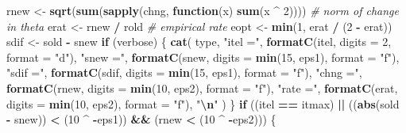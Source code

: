 \documentclass[
  12pt,
]{article}
\newenvironment{Shaded}{\begin{snugshade}}{\end{snugshade}}
\newcommand{\AttributeTok}[1]{\textcolor[rgb]{0.13,0.29,0.53}{#1}}
\newcommand{\CommentTok}[1]{\textcolor[rgb]{0.56,0.35,0.01}{\textit{#1}}}
\newcommand{\ControlFlowTok}[1]{\textcolor[rgb]{0.13,0.29,0.53}{\textbf{#1}}}
\newcommand{\DecValTok}[1]{\textcolor[rgb]{0.00,0.00,0.81}{#1}}
\newcommand{\FunctionTok}[1]{\textcolor[rgb]{0.13,0.29,0.53}{\textbf{#1}}}
\newcommand{\NormalTok}[1]{#1}
\newcommand{\OtherTok}[1]{\textcolor[rgb]{0.56,0.35,0.01}{#1}}
\newcommand{\SpecialCharTok}[1]{\textcolor[rgb]{0.81,0.36,0.00}{\textbf{#1}}}
\newcommand{\StringTok}[1]{\textcolor[rgb]{0.31,0.60,0.02}{#1}}
\begin{document}
\begin{Shaded}
\begin{Highlighting}[]
\NormalTok{      rnew }\OtherTok{\textless{}{-}}
        \FunctionTok{sqrt}\NormalTok{(}\FunctionTok{sum}\NormalTok{(}\FunctionTok{sapply}\NormalTok{(chng, }\ControlFlowTok{function}\NormalTok{(x)}
          \FunctionTok{sum}\NormalTok{(x }\SpecialCharTok{\^{}} \DecValTok{2}\NormalTok{)))) }\CommentTok{\# norm of change in theta}
\NormalTok{      erat }\OtherTok{\textless{}{-}}\NormalTok{ rnew }\SpecialCharTok{/}\NormalTok{ rold }\CommentTok{\# empirical rate}
\NormalTok{      eopt }\OtherTok{\textless{}{-}} \FunctionTok{min}\NormalTok{(}\DecValTok{1}\NormalTok{, erat }\SpecialCharTok{/}\NormalTok{ (}\DecValTok{2} \SpecialCharTok{{-}}\NormalTok{ erat))}
\NormalTok{      sdif }\OtherTok{\textless{}{-}}\NormalTok{ sold }\SpecialCharTok{{-}}\NormalTok{ snew}
      \ControlFlowTok{if}\NormalTok{ (verbose) \{}
        \FunctionTok{cat}\NormalTok{(}
\NormalTok{          type,}
          \StringTok{"itel ="}\NormalTok{,}
          \FunctionTok{formatC}\NormalTok{(itel, }\AttributeTok{digits =} \DecValTok{2}\NormalTok{, }\AttributeTok{format =} \StringTok{"d"}\NormalTok{),}
          \StringTok{"snew ="}\NormalTok{,}
          \FunctionTok{formatC}\NormalTok{(snew, }\AttributeTok{digits =} \FunctionTok{min}\NormalTok{(}\DecValTok{15}\NormalTok{, eps1), }\AttributeTok{format =} \StringTok{"f"}\NormalTok{),}
          \StringTok{"sdif ="}\NormalTok{,}
          \FunctionTok{formatC}\NormalTok{(sdif, }\AttributeTok{digits =} \FunctionTok{min}\NormalTok{(}\DecValTok{15}\NormalTok{, eps1), }\AttributeTok{format =} \StringTok{"f"}\NormalTok{),}
          \StringTok{"chng ="}\NormalTok{,}
          \FunctionTok{formatC}\NormalTok{(rnew, }\AttributeTok{digits =} \FunctionTok{min}\NormalTok{(}\DecValTok{10}\NormalTok{, eps2), }\AttributeTok{format =} \StringTok{"f"}\NormalTok{),}
          \StringTok{"rate ="}\NormalTok{,}
          \FunctionTok{formatC}\NormalTok{(erat, }\AttributeTok{digits =} \FunctionTok{min}\NormalTok{(}\DecValTok{10}\NormalTok{, eps2), }\AttributeTok{format =} \StringTok{"f"}\NormalTok{),}
          \StringTok{"}\SpecialCharTok{\textbackslash{}n}\StringTok{"}
\NormalTok{        )}
\NormalTok{      \}}
      \ControlFlowTok{if}\NormalTok{ ((itel }\SpecialCharTok{==}\NormalTok{ itmax) }\SpecialCharTok{||}
\NormalTok{          ((}\FunctionTok{abs}\NormalTok{(sold }\SpecialCharTok{{-}}\NormalTok{ snew)) }\SpecialCharTok{\textless{}}\NormalTok{ (}\DecValTok{10} \SpecialCharTok{\^{}} \SpecialCharTok{{-}}\NormalTok{eps1)) }\SpecialCharTok{\&\&}
\NormalTok{          (rnew }\SpecialCharTok{\textless{}}\NormalTok{ (}\DecValTok{10} \SpecialCharTok{\^{}} \SpecialCharTok{{-}}\NormalTok{eps2))) \{}

\end{Highlighting}
\end{Shaded}
\end{document}
